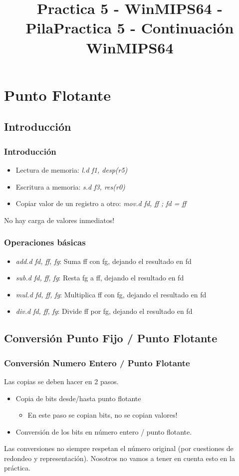 \documentclass{beamer}
\title{Practica 5 - WinMIPS64 - Pila}
\title{Practica 5 - Continuación WinMIPS64}
\begin{document}
\begin{frame}
\titlepage
\end{frame}

\section{Punto Flotante}

\subsection{Introducción}
\begin{frame}
\frametitle{Introducción}
\begin{itemize}
\item Lectura de memoria: \emph{l.d f1, desp(r5)}
\item Escritura a memoria: \emph{s.d f3, res(r0)}
\item Copiar valor de un registro a otro: \emph{mov.d fd, ff ; fd = ff }
\end{itemize}
No hay carga de valores inmediatos!
\end{frame}


\begin{frame}
\frametitle{Operaciones básicas}
\begin{itemize}
\item \emph{add.d fd, ff, fg}: Suma ff con fg, dejando el resultado en fd
\item \emph{sub.d fd, ff, fg}: Resta fg a ff, dejando el resultado en fd
\item \emph{mul.d fd, ff, fg}: Multiplica ff con fg, dejando el resultado en fd
\item \emph{div.d fd, ff, fg}: Divide ff por fg, dejando el resultado en fd
\end{itemize}
\end{frame}

\subsection{Conversión Punto Fijo / Punto Flotante}

\begin{frame}
\frametitle{Conversión Numero Entero / Punto Flotante}
Las copias se deben hacer en 2 pasos.
\begin{itemize}
\item Copia de bits desde/hasta punto flotante
\begin{itemize}
\item En este paso se copian bits, no se copian valores!
\end{itemize}
\item Conversión de los bits en número entero / punto flotante.
\end{itemize}

Las conversiones no siempre respetan el número original (por cuestiones de redondeo y representación). Nosotros no vamos a tener en cuenta esto en la práctica.
\end{frame}
\end{document}
